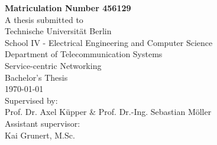 \begin{titlepage}
\begin{center}
		\textbf{Matriculation Number 456129}\\
		\vspace{2cm}
	 	A thesis submitted to\\
	 	\vspace{0.5cm}
		Technische Universität Berlin\\
		School IV - Electrical Engineering and Computer Science\\
		Department of Telecommunication Systems\\
		Service-centric Networking\\
		\vspace{0.5cm}
		Bachelor's Thesis\\
		\vspace{2.2cm}
		\today\\
		\vspace{1.2cm}
		\large
		Supervised by:\\
		Prof. Dr. Axel Küpper \& Prof. Dr.-Ing. Sebastian Möller\\
		\vspace{1cm}
		Assistant supervisor:\\
    Kai Grunert, M.Sc.  

		\end{center}
\end{titlepage}

\shipout\null
